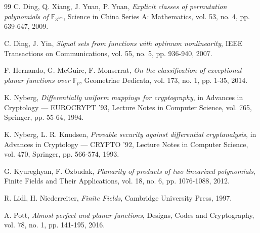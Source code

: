 \documentclass[12pt]{amsart}
\begin{document}
\begin{thebibliography}{99}
 C. Ding, Q. Xiang, J. Yuan, P. Yuan, \textit{Explicit classes of permutation polynomials of $\mathbb{F}_{3^{3m}}$}, Science in China Series A: Mathematics, vol. 53, no. 4, pp. 639-647, 2009.

 C. Ding, J. Yin, \textit{Signal sets from functions with optimum nonlinearity}, IEEE Transactions on Communications, vol. 55, no. 5, pp. 936-940, 2007.


 F. Hernando, G. McGuire, F. Monserrat, \textit{On the classification of exceptional planar functions over $\mathbb{F}_{p}$}, Geometriae Dedicata, vol. 173, no. 1, pp. 1-35, 2014.



 K. Nyberg, \textit{Differentially uniform mappings for cryptography}, in Advances in Cryptology --- EUROCRYPT '93, Lecture Notes in Computer Science, vol. 765, Springer, pp. 55-64, 1994.

 K. Nyberg, L. R. Knudsen, \textit{Provable security against differential cryptanalysis}, in Advances in Cryptology --- CRYPTO '92, Lecture Notes in Computer Science, vol. 470, Springer, pp. 566-574, 1993.

 G. Kyureghyan, F. \"{O}zbudak, \textit{Planarity of products of two linearized polynomials}, Finite Fields and Their Applications, vol. 18, no. 6, pp. 1076-1088, 2012.

 R. Lidl, H. Niederreiter, \textit{Finite Fields}, Cambridge University Press, 1997.

 A. Pott, \textit{Almost perfect and planar functions}, Designs, Codes and Cryptography, vol. 78, no. 1, pp. 141-195, 2016.



\end{thebibliography}
\end{document}
